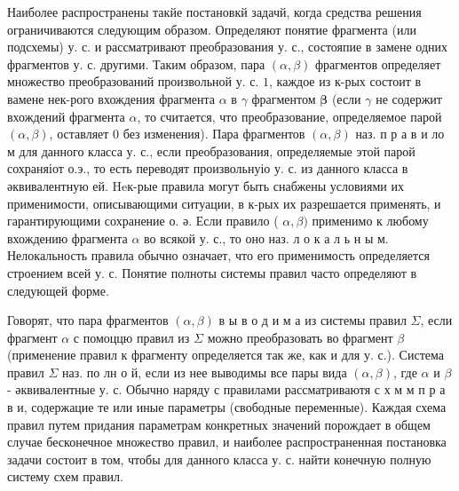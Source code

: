\documentclass[10pt]{article}
\begin{document}
Наиболее распространены такйе постановкй задачй, когда средства решения ограничиваются следующим образом. Определяют понятие фрагмента (или подсхемы) у. с. и рассматривают преобразования у. с., состояпие в замене одних фрагментов у. с. другими. Таким образом, пара $(\alpha, \beta)$ фрагментов определяет множество преобразований произвольной у. с. $\mathcal{1}$, каждое из к-рых состоит в вамене нек-рого вхождения фрагмента $\alpha$ в $\gamma$ фрагментом $\boldsymbol{\beta}$ (если $\gamma$ не содержит вхождений фрагмента $\alpha$, то считается, что преобразование, определяемое парой $(\alpha, \beta)$, оставляет $\mathcal{0}$ без изменения). Пара фрагментов $(\alpha, \beta)$ наз. п р а в и ло м для данного класса у. с., если преобразования, определяемые этой парой сохраняіот о.э., то есть переводят произвольнуіо у. с. из данного класса в әквивалентную ей. Heк-рые правила могут быть снабжены условиями их применимости, описывающими ситуации, в к-рых их разрешается применять, и гарантирующими сохранение о. ә. Если правило ( $\alpha, \beta)$ применимо к любому вхождению фрагмента $\alpha$ во всякой у. с., то оно наз. л о к а л ь н ы м. Нелокальность правила обычно означает, что его применимость определяется строением всей у. с. Понятие полноты системы правил часто определяют в следующей форме.



Говорят, что пара фрагментов $(\alpha, \beta)$ в ы в о д и м а из системы правил $\Sigma$, если фрагмент $\alpha$ с помоццю правил из $\Sigma$ можно преобразовать во фрагмент $\beta$ (применение правил к фрагменту определяется так же, как и для у. с.). Система правил $\Sigma$ наз. по лн о й, если из нее выводимы все пары вида $(\alpha, \beta)$, где $\alpha$ и $\beta$ - әквивалентные у. с. Обычно наряду с правилами рассматриваютя с х м м п р а в и, содержацие те или иные параметры (свободные переменные). Каждая схема правил путем придания параметрам конкретных значений порождает в общем случае бесконечное множество правил, и наиболее распространенная постановка задачи состоит в том, чтобы для данного класса у. с. найти конечную полную систему схем правил.
\end{document}
